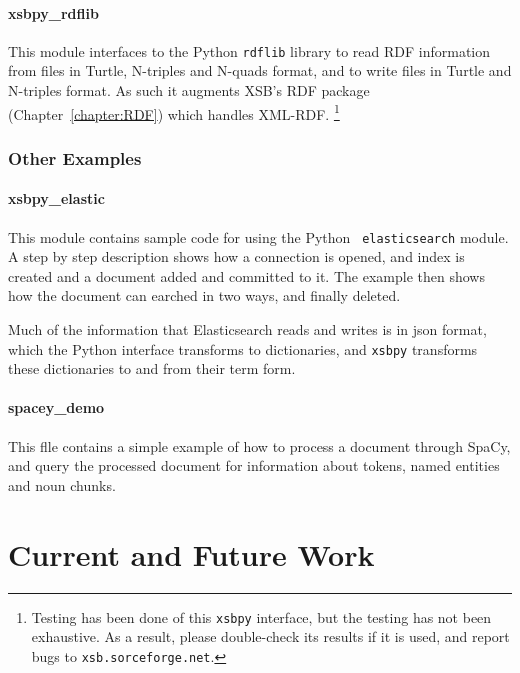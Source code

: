 \paragraph{xsbpy\_rdflib}
This module interfaces to the Python {\tt rdflib} library to read RDF
information from files in Turtle, N-triples and N-quads format, and to
write files in Turtle and N-triples format.  As such it augments XSB's
RDF package (Chapter~\ref{chapter:RDF}) which handles
XML-RDF. \footnote{Testing has been done of this {\tt xsbpy}
  interface, but the testing has not been exhaustive.  As a result,
  please double-check its results if it is used, and report bugs to
  {\tt xsb.sorceforge.net}.}

\subsubsection{Other Examples}

\paragraph{xsbpy\_elastic}
This module contains sample code for using the Python {\tt
  elasticsearch} module.  A step by step description shows how a
connection is opened, and index is created and a document added and
committed to it.  The example then shows how the document can earched
in two ways, and finally deleted.

Much of the information that Elasticsearch reads and writes is in json
format, which the Python interface transforms to dictionaries, and
{\tt xsbpy} transforms these dictionaries to and from their term form.

\paragraph{spacey\_demo}
This flle contains a simple example of how to process a document
through SpaCy, and query the processed document for
information about tokens, named entities and noun chunks.


\section{Current and Future Work}

